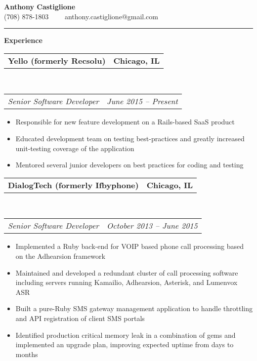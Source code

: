 \documentclass[10pt,letterpaper]{article}
\makeatletter
\newcommand{\headerrow}[2]
{\begin{tabular*}{\linewidth}{l@{\extracolsep{\fill}}r}
	#1 &
	#2 \\
\end{tabular*}}
\newenvironment{indentsection}[1]%
{\begin{list}{}%
	{\setlength{\leftmargin}{#1}}%
	\item[]%
}
{\end{list}}
\makeatother
\begin{document}
\begin{center}
{\LARGE \textbf {Anthony Castiglione}} \\ (708) 878-1803 \ \ \textbullet \ \ anthony.castiglione@gmail.com
	\end{center}
\hrule
\vspace{0.2in}
{\large \textbf{Experience}}

\begin{indentsection}{\parindent}
	\headerrow
		{\textbf{Yello (formerly Recsolu)} }
		{\textbf{Chicago, IL}}
	\\
	\headerrow
		{\emph{Senior Software Developer}}
		{\emph{June 2015 -- Present}}

	\begin{itemize}
	\renewcommand{\labelitemi}{$-$}
	\vspace{-0.1in}
    \item Responsible for new feature development on a Rails-based SaaS product
    \item Educated development team on testing best-practices and greatly increased unit-testing coverage of the application
    \item Mentored several junior developers on best practices for coding and testing
	\end{itemize}
\end{indentsection}

\begin{indentsection}{\parindent}
	\headerrow
		{\textbf{DialogTech (formerly Ifbyphone)} }
		{\textbf{Chicago, IL}}
	\\
	\headerrow
		{\emph{Senior Software Developer}}
		{\emph{October 2013 -- June 2015}}

	\begin{itemize}
	\renewcommand{\labelitemi}{$-$}
	\vspace{-0.1in}
    \item Implemented a Ruby back-end for VOIP based phone call processing based on the Adhearsion framework
    \item Maintained and developed a redundant cluster of call processing software including servers running Kamailio, Adhearsion, Asterisk, and Lumenvox ASR
    \item Built a pure-Ruby SMS gateway management application to handle throttling and API registration of client SMS portals
    \item Identified production critical memory leak in a combination of gems and implemented an upgrade plan, improving expected uptime from days to months
	\end{itemize}
\end{indentsection}
\end{document}
